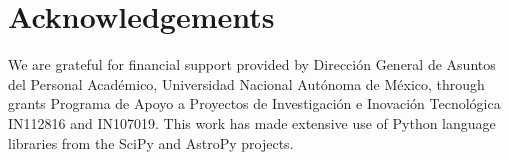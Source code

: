 \documentclass[useAMS, usenatbib, a4paper]{mnras}
\begin{document}




\section*{Acknowledgements}
We are grateful for financial support provided by Dirección General de
Asuntos del Personal Académico, Universidad Nacional Autónoma de
México, through grants Programa de Apoyo a Proyectos de Investigación
e Inovación Tecnológica IN112816 and IN107019.  This work has made
extensive use of Python language libraries from the SciPy
\citep{Jones:2001a} and AstroPy \citep{Astropy-Collaboration:2013a,
  Astropy-Collaboration:2018a} projects.




\appendix


\bsp	%
\label{lastpage}
\end{document}
